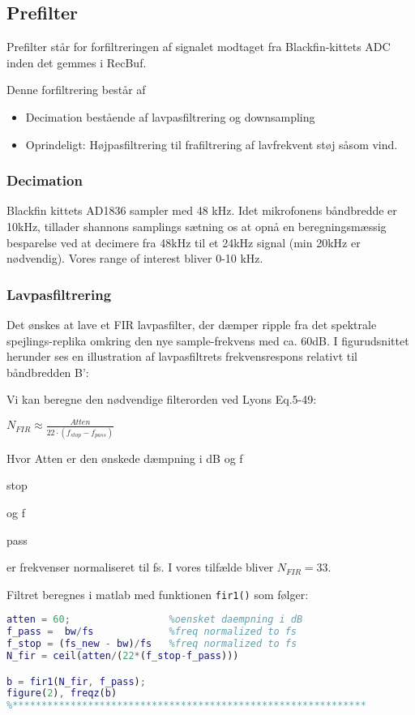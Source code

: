 \subsection*{Prefilter}
Prefilter står for forfiltreringen af signalet modtaget fra Blackfin-kittets ADC inden det gemmes i RecBuf.

Denne forfiltrering består af
\begin{itemize}
	\item Decimation bestående af lavpasfiltrering og downsampling
	\item Oprindeligt: Højpasfiltrering til frafiltrering af lavfrekvent støj såsom vind.
\end{itemize}

\subsubsection{Decimation}
Blackfin kittets AD1836 sampler med 48 kHz. Idet mikrofonens båndbredde er 10kHz, tillader shannons samplings sætning os at opnå en beregningsmæssig besparelse ved at decimere fra 48kHz til et 24kHz signal (min 20kHz er nødvendig).
Vores range of interest bliver 0-10 kHz.

\subsubsection*{Lavpasfiltrering} 
Det ønskes at lave et FIR lavpasfilter, der dæmper ripple fra det spektrale spejlings-replika omkring den nye sample-frekvens med ca. 60dB. 
I figurudsnittet herunder ses en illustration af lavpasfiltrets frekvensrespons relativt til båndbredden B':

Vi kan beregne den nødvendige filterorden ved Lyons Eq.5-49:
\begin{center}
${ N }_{ FIR }\approx \frac { Atten }{ 22\cdot \left( { f }_{ stop }-{ f }_{ pass } \right)  }$
\end{center}
Hvor Atten er den ønskede dæmpning i dB og f\begin{tiny}stop\end{tiny} og f\begin{tiny}pass\end{tiny} er frekvenser normaliseret til fs. I vores tilfælde bliver ${ N }_{ FIR }=33$.

Filtret beregnes i matlab med funktionen \verb+fir1()+ som følger:
\begin{lstlisting}[language=Matlab]
%**** LOW PASS ***********************************************
atten = 60;                 %oensket daempning i dB
f_pass =  bw/fs             %freq normalized to fs
f_stop = (fs_new - bw)/fs   %freq normalized to fs
N_fir = ceil(atten/(22*(f_stop-f_pass)))

b = fir1(N_fir, f_pass);
figure(2), freqz(b)
%*************************************************************
\end{lstlisting}

